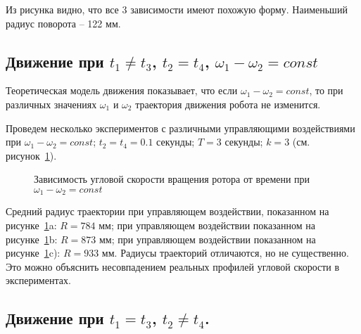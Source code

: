 Из рисунка видно, что все 3 зависимости имеют похожую форму. Наименьший радиус поворота -- 122 мм.

\subsection{Движение при $ t_1 \neq t_3 $, $ t_2 = t_4 $, $ \omega_1 - \omega_2 = const $}


Теоретическая модель движения показывает, что если $ \omega_1 - \omega_2 = const $, то при различных значениях $ \omega_1 $ и $ \omega_2 $ траектория движения робота не изменится.

Проведем несколько экспериментов с различными управляющими воздействиями при $ \omega_1 - \omega_2 = const $; $ t_2=t_4=0.1 $ секунды; $ T = 3 $ секунды; $ k=3 $ (см. рисунок~\ref{ControlActionDifferentAmp}).

\begin{figure}[!ht]
	\begin{minipage}[h]{0.3\linewidth}
	\end{minipage}
	\hfill
	\begin{minipage}[h]{0.3\linewidth}
	\end{minipage}
	\hfill
	\begin{minipage}[h]{0.3\linewidth}
	\end{minipage}
	\caption{Зависимость угловой скорости вращения ротора от времени при $ \omega_1 - \omega_2 = const $}
	\label{ControlActionDifferentAmp}
\end{figure}

Средний радиус траектории при управляющем воздействии, показанном на рисунке~\ref{ControlActionDifferentAmp}a: $ R = 784 $ мм; при управляющем воздействии показанном на рисунке~\ref{ControlActionDifferentAmp}b: $ R = 873 $ мм; при управляющем воздействии показанном на рисунке~\ref{ControlActionDifferentAmp}c): $ R = 933 $ мм. Радиусы траекторий отличаются, но не существенно. Это можно объяснить несовпадением реальных профилей угловой скорости в экспериментах.


\subsection{Движение при $ t_1 = t_3 $, $ t_2 \neq t_4 $.}

